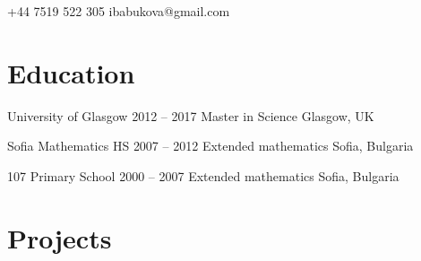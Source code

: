\documentclass{tccv}
\begin{document}
    {+44 7519 522 305}
    {ibabukova@gmail.com}

\section{Education}

\begin{yearlist}

\item[University of Glasgow]
     {2012 -- 2017}
     {Master in Science}
     {Glasgow, UK}

\item[Sofia Mathematics HS]
     {2007 -- 2012}
     {Extended mathematics}
     {Sofia, Bulgaria}

\item[107 Primary School]
     {2000 -- 2007}
     {Extended mathematics}
     {Sofia, Bulgaria}
\end{yearlist}

\section{Projects}
\end{document}
